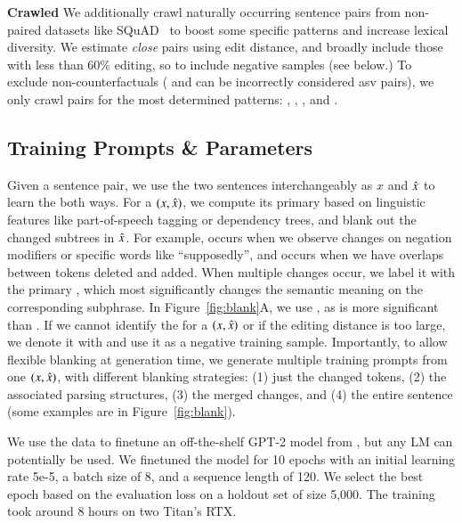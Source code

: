 \textbf{Crawled} 
We additionally crawl naturally occurring sentence pairs from non-paired datasets like SQuAD~\cite{rajpurkar-etal-2016-squad} to boost some specific patterns and increase lexical diversity. 
We estimate \emph{close} pairs using edit distance, and broadly include those with less than 60\% editing, so to include negative samples (see below.)
To exclude non-counterfactuals (\eg {} and  can be incorrectly considered asv pairs), we only crawl pairs for the most determined patterns: , , , and .


\subsection{Training Prompts \& Parameters}

Given a sentence pair, we use the two sentences interchangeably as $x$ and $\hat{x}$ to learn the \tagstrs both ways.
For a $(x, \hat{x})$, we compute its primary \tagstr based on linguistic features like part-of-speech tagging or dependency trees, and blank out the changed subtrees in $\hat{x}$.
For example,  occurs when we observe changes on negation modifiers or specific words like ``supposedly'', and  occurs when we have overlaps between tokens deleted and added.
When multiple changes occur, we label it with the primary \tagstr, which most significantly changes the semantic meaning on the corresponding subphrase.
In Figure~\ref{fig:blank}A, we use , as  is more significant than .
If we cannot identify the \tagstr for a $(x, \hat{x})$ or if the editing distance is too large, we denote it with  and use it as a negative training sample.
Importantly, to allow flexible blanking at generation time, we generate multiple training prompts from one $(x, \hat{x})$, with different blanking strategies: (1) just the changed tokens, (2) the associated parsing structures, (3) the merged changes, and (4) the entire sentence (some examples are in Figure~\ref{fig:blank}).

We use the data to finetune an off-the-shelf GPT-2 model from \citet{Wolf2019HuggingFacesTS}, but any LM can potentially be used.
We finetuned the model for 10 epochs with an initial learning rate 5e-5, a batch size of 8, and a sequence length of 120.
We select the best epoch based on the evaluation loss on a holdout set of size 5,000.
The training took around 8 hours on two Titan's RTX.


